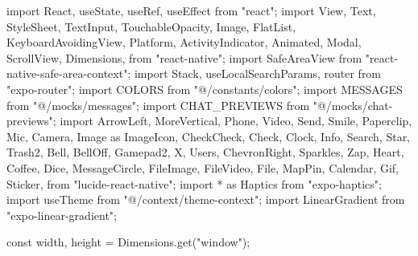 import React, { useState, useRef, useEffect } from "react";
import {
  View,
  Text,
  StyleSheet,
  TextInput,
  TouchableOpacity,
  Image,
  FlatList,
  KeyboardAvoidingView,
  Platform,
  ActivityIndicator,
  Animated,
  Modal,
  ScrollView,
  Dimensions,
} from "react-native";
import { SafeAreaView } from "react-native-safe-area-context";
import { Stack, useLocalSearchParams, router } from "expo-router";
import { COLORS } from "@/constants/colors";
import { MESSAGES } from "@/mocks/messages";
import { CHAT_PREVIEWS } from "@/mocks/chat-previews";
import {
  ArrowLeft,
  MoreVertical,
  Phone,
  Video,
  Send,
  Smile,
  Paperclip,
  Mic,
  Camera,
  Image as ImageIcon,
  CheckCheck,
  Check,
  Clock,
  Info,
  Search,
  Star,
  Trash2,
  Bell,
  BellOff,
  Gamepad2,
  X,
  Users,
  ChevronRight,
  Sparkles,
  Zap,
  Heart,
  Coffee,
  Dice,
  MessageCircle,
  FileImage,
  FileVideo,
  File,
  MapPin,
  Calendar,
  Gif,
  Sticker,
} from "lucide-react-native";
import * as Haptics from "expo-haptics";
import { useTheme } from "@/context/theme-context";
import { LinearGradient } from "expo-linear-gradient";

const { width, height } = Dimensions.get("window");

